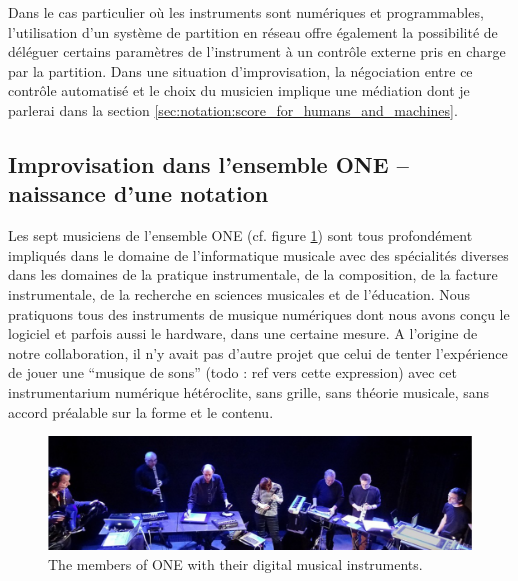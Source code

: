 \indent Dans le cas particulier où les instruments sont numériques et programmables, l'utilisation d'un système de partition en réseau offre également la possibilité de déléguer certains paramètres de l'instrument à un contrôle externe pris en charge par la partition. Dans une situation d'improvisation, la négociation entre ce contrôle automatisé et le choix du musicien implique une médiation dont je parlerai dans la section \ref{sec:notation:score_for_humans_and_machines}.

\subsection{Improvisation dans l'ensemble ONE – naissance d'une notation}

\noindent Les sept musiciens de l'ensemble ONE (cf. figure \ref{fig:notation:one-fullband}) sont tous profondément impliqués dans le domaine de l'informatique musicale avec des spécialités diverses dans les domaines de la pratique instrumentale, de la composition, de la facture instrumentale, de la recherche en sciences musicales et de l'éducation. Nous pratiquons tous des instruments de musique numériques dont nous avons conçu le logiciel et parfois aussi le hardware, dans une certaine mesure. A l'origine de notre collaboration, il n'y avait pas d'autre projet que celui de tenter l'expérience de jouer une ``musique de sons'' (todo : ref vers cette expression) avec cet instrumentarium numérique hétéroclite, sans grille, sans théorie musicale, sans accord préalable sur la forme et le contenu.\\

\begin{figure}[!htbp]
	\includegraphics[width=\textwidth]{gfx/notation/ONE-fullBand.png}
	\caption{The members of ONE with their digital musical instruments.}
	\label{fig:notation:one-fullband}
\end{figure}

